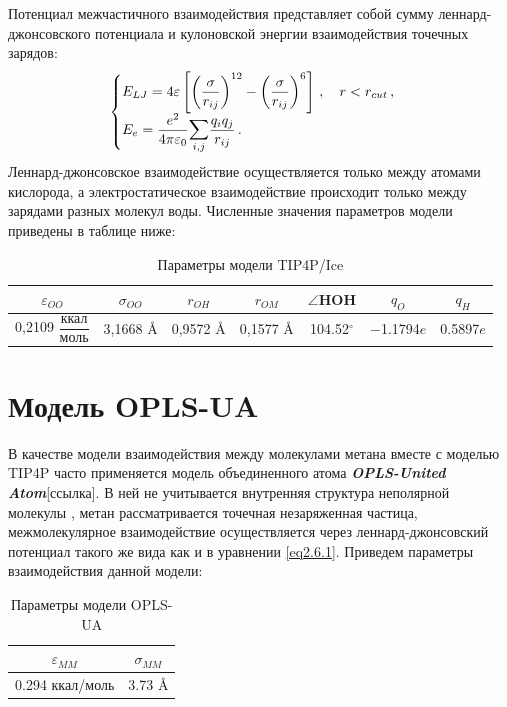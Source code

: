 Потенциал межчастичного взаимодействия представляет собой сумму леннард-джонсовского потенциала и кулоновской энергии взаимодействия точечных зарядов:
\begin{equation}
    \begin{cases}
        E_{LJ} = 4\varepsilon\left[\left(\dfrac{\sigma}{r_{ij}}\right)^{12} - \left(\dfrac{\sigma}{r_{ij}}\right)^6\right]\,,\quad r<r_{cut}\,, \\
        E_{e} = \dfrac{e^2}{4\pi\varepsilon_0}\mathlarger{\mathlarger{\sum}}\limits_{i,j}\dfrac{q_i q_j}{r_{ij}}\,.
    \end{cases}
    \label{eq2.6.1}
\end{equation}
Леннард-джонсовское взаимодействие осуществляется только между атомами кислорода, а электростатическое взаимодействие происходит только между зарядами разных молекул воды. Численные значения параметров модели приведены в таблице ниже:
\begin{table}[H]
    \centering
    \caption{Параметры модели TIP4P/Ice}
    \renewcommand{\arraystretch}{1.8}
    \begin{tabular}{c|c|c|c|c|c|c}
        $\varepsilon_{OO}$ & $\sigma_{OO}$ & $r_{OH}$ & $r_{OM}$ & $\angle$HOH & $q_{O}$ & $q_{H}$ \\ \hline
        0,2109 $\dfrac{\text{ккал}}{\text{моль}}$ & 3,1668 $\si{\angstrom}$ & 0,9572 $\si{\angstrom}$ & 0,1577 $\si{\angstrom}$ & 104.52$^{\circ}$ & −1.1794$e$ & 0.5897$e$ \\ 
    \end{tabular}
    \label{table1}
\end{table}

\section{Модель OPLS-UA}
В качестве модели взаимодействия между молекулами метана вместе с моделью TIP4P часто применяется модель объединенного атома \textbf{\textit{OPLS-United Atom}}[ссылка]. В ней не учитывается внутренняя структура неполярной молекулы , метан рассматривается точечная незаряженная частица, межмолекулярное взаимодействие осуществляется через леннард-джонсовский потенциал такого же вида как и в уравнении \eqref{eq2.6.1}. Приведем параметры взаимодействия данной модели:

\begin{table}[H]
    \centering
    \caption{Параметры модели OPLS-UA}
    \renewcommand{\arraystretch}{1.5}
    \begin{tabular}{c|c}
        $\varepsilon_{MM}$ & $\sigma_{MM}$ \\ \hline
        0.294 ккал/моль & 3.73 $\si{\angstrom}$
    \end{tabular}
    \label{table2}
\end{table}

